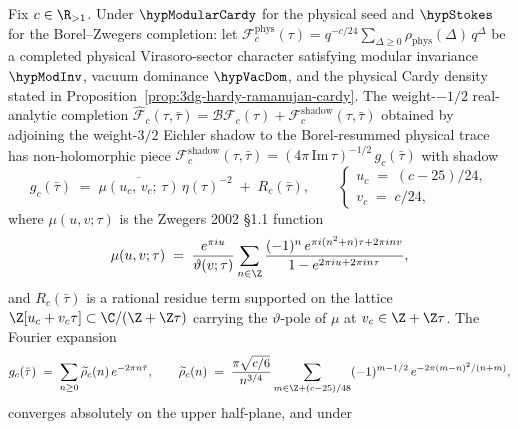 \begin{theorem}
\label{thm:3dg-zwegers-mu-shadow-virasoro}
%
%
%
Fix $c \in \R_{> 1}$. Under $\hypModularCardy$ for the physical seed
and $\hypStokes$ for the Borel--Zwegers completion: let
$\mathcal F^{\mathrm{phys}}_c(\tau)
= q^{-c/24}\sum_{\Delta \ge 0}\rho_{\mathrm{phys}}(\Delta)\,q^\Delta$
be a completed physical Virasoro-sector character satisfying modular
invariance $\hypModInv$, vacuum dominance $\hypVacDom$, and the
physical Cardy density stated in
Proposition~\ref{prop:3dg-hardy-ramanujan-cardy}. The weight-$-1/2$ real-analytic
completion
$\widehat{\mathcal F}_c(\tau,\bar\tau)
= \mathcal B\mathcal F_c(\tau) + \mathcal F^{\mathrm{shadow}}_c(\tau,\bar\tau)$
obtained by adjoining the weight-$3/2$ Eichler shadow to the
Borel-resummed physical trace has non-holomorphic piece
$\mathcal F^{\mathrm{shadow}}_c(\tau,\bar\tau)
= (4\pi\,\mathrm{Im}\,\tau)^{-1/2}\,g_c(\bar\tau)$
with shadow
\begin{equation}
\label{eq:3dg-gc-eichler}
g_c(\bar\tau)
\;=\;
\overline{\mu(u_c,\,v_c;\,\tau)}\,\eta(\tau)^{-2}
\;+\;
R_c(\bar\tau),
\qquad
\begin{cases}
u_c \;=\; (c - 25)/24,\\[2pt]
v_c \;=\; c/24,
\end{cases}
\end{equation}
where $\mu(u, v;\tau)$ is the Zwegers 2002 \S 1.1 function
\begin{equation}
\label{eq:3dg-zwegers-mu-def}
\mu(u, v;\tau)
\;=\;
\frac{e^{\pi i u}}{\vartheta(v;\tau)}
\sum_{n \in \Z}
\frac{(-1)^{n}\,e^{\pi i(n^{2} + n)\tau + 2\pi i n v}}
{1 - e^{2\pi i u + 2\pi i n\tau}},
\end{equation}
and $R_c(\bar\tau)$ is a rational residue term supported on the
lattice $\Z[u_c + v_c\tau] \subset \C/(\Z + \Z\tau)$ carrying the
$\vartheta$-pole of $\mu$ at $v_c \in \Z + \Z\tau$. The Fourier
expansion
\begin{equation}
\label{eq:3dg-gc-series}
g_c(\bar\tau)
\;=\;
\sum_{n \ge 0}\widetilde\rho_c(n)\,e^{-2\pi n\bar\tau},
\qquad
\widetilde\rho_c(n)
\;=\;
\frac{\pi\sqrt{c/6}}{n^{3/4}}
\sum_{m \in \Z + (c-25)/48}
(-1)^{m - 1/2}\,
e^{-2\pi(m - n)^{2}/(n + m)},
\end{equation}
converges absolutely on the upper half-plane, and under

\end{theorem}
